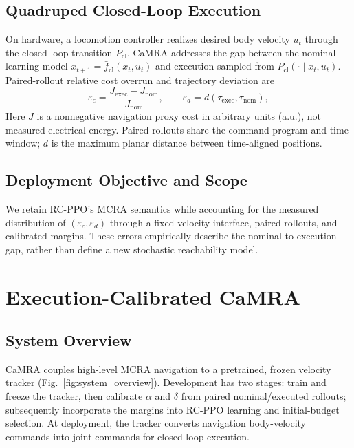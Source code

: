 \documentclass[conference]{IEEEtran}
\begin{document}
\subsection{Quadruped Closed-Loop Execution}
On hardware, a locomotion controller realizes desired body velocity $u_t$ through
the closed-loop transition $P_{\mathrm{cl}}$. CaMRA addresses the gap between the
nominal learning model $x_{t+1}=\bar f_{\mathrm{cl}}(x_t,u_t)$ and execution sampled
from $P_{\mathrm{cl}}(\cdot\mid x_t,u_t)$. Paired-rollout relative cost overrun
and trajectory deviation are
\begin{equation}
\varepsilon_c=\frac{J_{\mathrm{exec}}-J_{\mathrm{nom}}}{J_{\mathrm{nom}}},
\qquad
\varepsilon_d=d(\tau_{\mathrm{exec}},\tau_{\mathrm{nom}}),
\label{eq:execution_errors}
\end{equation}
Here $J$ is a nonnegative navigation proxy cost in arbitrary units (a.u.),
not measured electrical energy. Paired rollouts share the command program and
time window; $d$ is the maximum planar distance between time-aligned positions.

\subsection{Deployment Objective and Scope}
We retain RC-PPO's MCRA semantics while accounting for the measured distribution
of $(\varepsilon_c,\varepsilon_d)$ through a fixed velocity interface, paired
rollouts, and calibrated margins. These errors empirically describe the
nominal-to-execution gap, rather than define a new stochastic reachability model.

\section{Execution-Calibrated CaMRA}
\subsection{System Overview}
CaMRA couples high-level MCRA navigation to a pretrained, frozen velocity tracker
(Fig.~\ref{fig:system_overview}). Development has two stages: train and freeze
the tracker, then calibrate $\alpha$ and $\delta$ from paired nominal/executed
rollouts; subsequently incorporate the margins into RC-PPO learning and
initial-budget selection. At deployment, the tracker converts navigation
body-velocity commands into joint commands for closed-loop execution.
\end{document}
